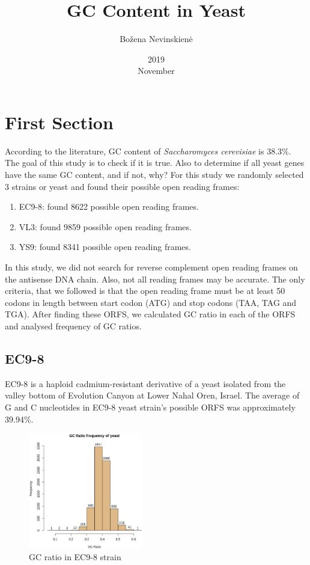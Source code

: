 \documentclass{article}
\begin{document}
\title{GC Content in Yeast}
\date{2019\\November}
\author{Bo\v{z}ena Nevinskien\.{e}}
\maketitle

\section{First Section}
According to the literature, GC content of \emph{Saccharomyces cerevisiae} is 38.3\%. 
The goal of this study is to check if it is true. 
Also to determine if all yeast genes have the same GC content, and if not, why? 
For this study we randomly selected 3 strains or yeast and found their possible open reading frames:
\begin{enumerate}
	\item EC9-8: found 8622 possible open reading frames.
	\item VL3: found 9859 possible open reading frames.
	\item YS9: found 8341 possible open reading frames.
\end{enumerate}

In this study, we did not search for reverse complement open reading frames on the antisense DNA chain.                    
Also, not all reading frames may be accurate. The only criteria, that we followed is that the open reading frame must be
at least 50 codons in length between start codon (ATG) and stop codons (TAA, TAG and TGA).
After finding these ORFS, we calculated GC ratio in each of the ORFS and analysed frequency of GC ratios.


\subsection{EC9-8}

EC9-8 is a haploid cadmium-resistant derivative of a yeast isolated from the valley bottom of Evolution Canyon 
at Lower Nahal Oren, Israel.
The average of G and C nucleotides in EC9-8 yeast strain's possible ORFS was approximately 39.94\%.

\begin{figure}[H]
\vspace{30pt}%
\includegraphics[width=50mm,scale=0.3]{images/EC9-8_ASinica_2011_AGSJ01000000.eps}
\caption{GC ratio in EC9-8 strain}
\label{fig:method}
\end{figure}
\end{document}
